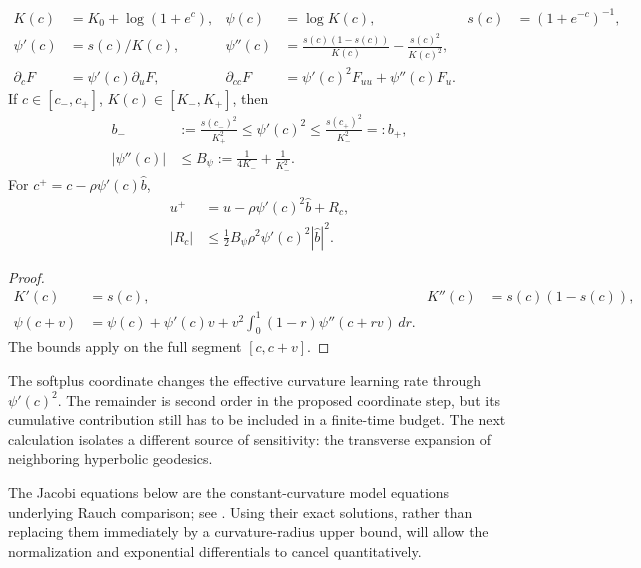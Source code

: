 \begin{proposition}
\label{prop:softplus-rigid}
\begin{align}
 K(c)&=K_0+\log(1+e^c),&\psi(c)&=\log K(c),&s(c)&=(1+e^{-c})^{-1},\\
 \psi'(c)&=s(c)/K(c),&
 \psi''(c)&=\frac{s(c)(1-s(c))}{K(c)}-\frac{s(c)^2}{K(c)^2},\\
 \partial_cF&=\psi'(c)\partial_uF,&
 \partial_{cc}F&=\psi'(c)^2F_{uu}+\psi''(c)F_u.
\end{align}
If $c\in[c_-,c_+]$, $K(c)\in[K_-,K_+]$, then
\begin{align}
 b_-&:=\frac{s(c_-)^2}{K_+^2}
 \le\psi'(c)^2\le\frac{s(c_+)^2}{K_-^2}=:b_+,\\
 |\psi''(c)|&\le B_\psi:=\frac1{4K_-}+\frac1{K_-^2}.
\end{align}
For $c^+=c-\rho\psi'(c)\widehat b$,
\begin{align}
 u^+&=u-\rho\psi'(c)^2\widehat b+R_c,\\
 |R_c|&\le\tfrac12B_\psi\rho^2\psi'(c)^2|\widehat b|^2.
\end{align}
\end{proposition}
\begin{proof}
\begin{align}
 K'(c)&=s(c),&K''(c)&=s(c)(1-s(c)),\\
 \psi(c+v)&=\psi(c)+\psi'(c)v+
 v^2\int_0^1(1-r)\psi''(c+rv)\,dr.
\end{align}
The bounds apply on the full segment $[c,c+v]$.
\end{proof}

The softplus coordinate changes the effective curvature learning rate through $\psi'(c)^2$. The remainder is second order in the proposed coordinate step, but its cumulative contribution still has to be included in a finite-time budget. The next calculation isolates a different source of sensitivity: the transverse expansion of neighboring hyperbolic geodesics.

The Jacobi equations below are the constant-curvature model equations underlying Rauch comparison; see \citet{lee2018riemannian}. Using their exact solutions, rather than replacing them immediately by a curvature-radius upper bound, will allow the normalization and exponential differentials to cancel quantitatively.

